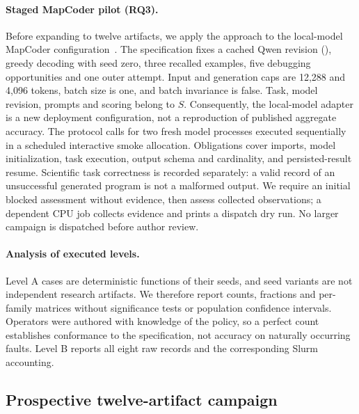 \paragraph{Staged MapCoder pilot (RQ3).} Before expanding to twelve artifacts, we apply the approach to the local-model MapCoder configuration~\cite{resaiartifact7}. The specification fixes a cached Qwen revision (), greedy decoding with seed zero, three recalled examples, five debugging opportunities and one outer attempt. Input and generation caps are 12,288 and 4,096 tokens, batch size is one, and batch invariance is false. Task, model revision, prompts and scoring belong to $S$. Consequently, the local-model adapter is a new deployment configuration, not a reproduction of published aggregate accuracy. The protocol calls for two fresh model processes executed sequentially in a scheduled interactive smoke allocation. Obligations cover imports, model initialization, task execution, output schema and cardinality, and persisted-result resume. Scientific task correctness is recorded separately: a valid record of an unsuccessful generated program is not a malformed output. We require an initial blocked assessment without evidence, then assess collected observations; a dependent CPU job collects evidence and prints a dispatch dry run. No larger campaign is dispatched before author review.

\paragraph{Analysis of executed levels.} Level A cases are deterministic functions of their seeds, and seed variants are not independent research artifacts. We therefore report counts, fractions and per-family matrices without significance tests or population confidence intervals. Operators were authored with knowledge of the policy, so a perfect count establishes conformance to the specification, not accuracy on naturally occurring faults. Level B reports all eight raw records and the corresponding Slurm accounting.

\subsection{Prospective twelve-artifact campaign}\label{sec:campaign}
